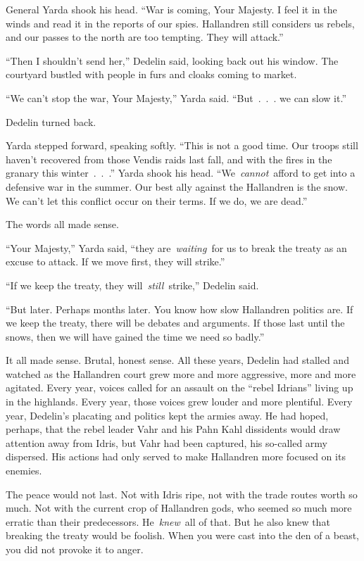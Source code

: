 General Yarda shook his head. “War is coming, Your Majesty. I feel it in the winds and read it in the reports of our spies. Hallandren still considers us rebels, and our passes to the north are too tempting. They will attack.”

“Then I shouldn’t send her,” Dedelin said, looking back out his window. The courtyard bustled with people in furs and cloaks coming to market.

“We can’t stop the war, Your Majesty,” Yarda said. “But~.~.~. we can slow it.”

Dedelin turned back.

Yarda stepped forward, speaking softly. “This is not a good time. Our troops still haven’t recovered from those Vendis raids last fall, and with the fires in the granary this winter~.~.~.” Yarda shook his head. “We~\textit{cannot}~afford to get into a defensive war in the summer. Our best ally against the Hallandren is the snow. We can’t let this conflict occur on their terms. If we do, we are dead.”

The words all made sense.

“Your Majesty,” Yarda said, “they are~\textit{waiting}~for us to break the treaty as an excuse to attack. If we move first, they will strike.”

“If we keep the treaty, they will~\textit{still}~strike,” Dedelin said.

“But later. Perhaps months later. You know how slow Hallandren politics are. If we keep the treaty, there will be debates and arguments. If those last until the snows, then we will have gained the time we need so badly.”

It all made sense. Brutal, honest sense. All these years, Dedelin had stalled and watched as the Hallandren court grew more and more aggressive, more and more agitated. Every year, voices called for an assault on the “rebel Idrians” living up in the highlands. Every year, those voices grew louder and more plentiful. Every year, Dedelin’s placating and politics kept the armies away. He had hoped, perhaps, that the rebel leader Vahr and his Pahn Kahl dissidents would draw attention away from Idris, but Vahr had been captured, his so-called army dispersed. His actions had only served to make Hallandren more focused on its enemies.

The peace would not last. Not with Idris ripe, not with the trade routes worth so much. Not with the current crop of Hallandren gods, who seemed so much more erratic than their predecessors. He~\textit{knew}~all of that. But he also knew that breaking the treaty would be foolish. When you were cast into the den of a beast, you did not provoke it to anger.

